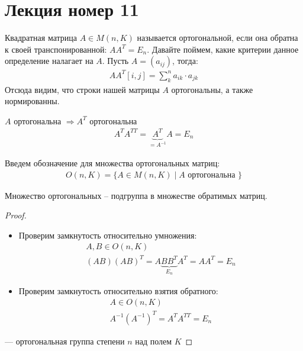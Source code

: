 \section{Лекция номер 11}
Квадратная матрица $A \in M(n, K)$ называется ортогональной, если она обратна к своей транспонированной: $AA^T = E_n$. 
Давайте поймем, какие критерии данное определение налагает на $A$. Пусть $A = (a_{ij})$, тогда: 
\begin{gather*}
    AA^T [i, j] = \sum\limits_{k}^n a_{i k} \cdot a_{jk}
\end{gather*}
Отсюда видим, что строки нашей матрицы $A$ ортогональны, а также нормированны.
\begin{lemma}
    $A$ ортогональна $\Longrightarrow A^T$ ортогональна
    \begin{gather*}
        A^T A^{TT} = \underbrace{A^T}_{= A^{-1}} A = E_n
    \end{gather*}
\end{lemma}
\begin{conj}
    Введем обозначение для множества ортогональных матриц: 
    \begin{gather*}
        O(n, K) = \{ A \in M(n, K) \mid A \text{ ортогональна } \}
    \end{gather*}
\end{conj}
\begin{theorem-non}
    Множество ортогональных -- подгруппа в множестве обратимых матриц.
\end{theorem-non}
\begin{proof} \quad 

    \begin{itemize}
        \item Проверим замкнутость относительно умножения: 
            \begin{gather*}
                A, B \in O(n, K) \\
                (AB)(AB)^T = A\underbrace{B B^T}_{E_n} A^T = A A^T = E_n 
            \end{gather*}
        \item Проверим замкнутость относительно взятия обратного: 
            \begin{gather*}
                A \in O(n, K) \\
                A^{-1} (A^{-1})^T = A^T A^{TT} = E_n
            \end{gather*}
    \end{itemize}
    --- ортогональная группа степени $n$ над полем $K$
\end{proof}

